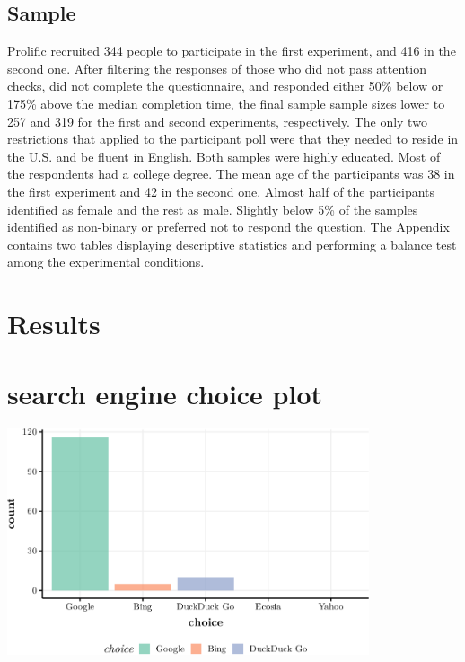 \documentclass[
  11pt,
]{article}
\begin{document}
\hypertarget{sample}{%
\subsection{Sample}\label{sample}}

Prolific recruited 344 people to participate in the first experiment, and 416 in the second one. After filtering the responses of those who did not pass attention checks, did not complete the questionnaire, and responded either 50\% below or 175\% above the median completion time, the final sample sample sizes lower to 257 and 319 for the first and second experiments, respectively. The only two restrictions that applied to the participant poll were that they needed to reside in the U.S. and be fluent in English. Both samples were highly educated. Most of the respondents had a college degree. The mean age of the participants was 38 in the first experiment and 42 in the second one. Almost half of the participants identified as female and the rest as male. Slightly below 5\% of the samples identified as non-binary or preferred not to respond the question. The Appendix contains two tables displaying descriptive statistics and performing a balance test among the experimental conditions.

\hypertarget{section}{%
\subsection{}\label{section}}

\hypertarget{results}{%
\section{Results}\label{results}}

\hypertarget{search-engine-choice-plot}{%
\section{search engine choice plot}\label{search-engine-choice-plot}}

\begin{center}\includegraphics[width=0.8\textwidth]{Results-July19_files/figure-latex/choice_se-1} \end{center}
\end{document}
